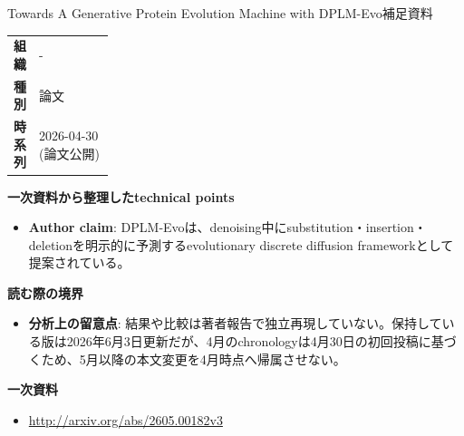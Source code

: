 \begin{technicalnote}{Towards A Generative Protein Evolution Machine with DPLM-Evo}{補足資料}
\begingroup
\begin{tabularx}{\linewidth}{@{}>{\bfseries}p{0.22\linewidth}X@{}}
組織 & - \\
種別 & 論文 \\
時系列 & 2026-04-30 (論文公開) \\
\end{tabularx}
\smallskip
{\bfseries 一次資料から整理したtechnical points}
\begin{itemize}[leftmargin=1.5em,itemsep=0.35em]
\item \textbf{Author claim}: DPLM-Evoは、denoising中にsubstitution・insertion・deletionを明示的に予測するevolutionary discrete diffusion frameworkとして提案されている。
\end{itemize}
{\bfseries 読む際の境界}
\begin{itemize}[leftmargin=1.5em,itemsep=0.35em]
\item \textbf{分析上の留意点}: 結果や比較は著者報告で独立再現していない。保持している版は2026年6月3日更新だが、4月のchronologyは4月30日の初回投稿に基づくため、5月以降の本文変更を4月時点へ帰属させない。
\end{itemize}
\begin{samepage}
{\bfseries 一次資料}
\begingroup\sloppy
\begin{itemize}[leftmargin=1.5em,itemsep=0.25em]
\item {\scriptsize\url{http://arxiv.org/abs/2605.00182v3}}
\end{itemize}
\endgroup
\end{samepage}
\endgroup
\end{technicalnote}
\medskip

